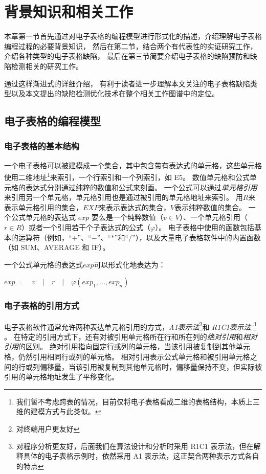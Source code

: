 \chapter{背景知识和相关工作}
本章第一节首先通过对电子表格的编程模型进行形式化的描述，介绍理解电子表格编程过程的必要背景知识，
然后在第二节，结合两个有代表性的实证研究工作，介绍各种类型的电子表格缺陷，
最后在第三节简要介绍电子表格的缺陷预防和缺陷检测相关的研究工作。

通过这样渐进式的详细介绍，
有利于读者进一步理解本文关注的电子表格缺陷类型以及本文提出的缺陷检测优化技术在整个相关工作图谱中的定位。


\section{电子表格的编程模型}

\subsection{电子表格的基本结构}
一个电子表格可以被建模成一个集合，其中包含带有表达式的单元格，这些单元格使用二维地址\footnote{我们暂不考虑跨表的情况，目前仅将电子表格看成二维的表格结构，本质上三维的建模方式与此类似。}来索引，一个行索引和一个列索引，如 E5。
数值单元格和公式单元格的表达式分别通过纯粹的数值和公式来刻画。
一个公式可以通过\textit{单元格引用}来引用另一个单元格，单元格引用也是通过被引用的单元格地址来索引。
用$R$来表示单元格引用的集合，$EXP$来表示表达式的集合，$V$表示纯粹数值的集合。
一个公式单元格的表达式 $exp$ 要么是一个纯粹数值（$v \in V$）、一个单元格引用（$r \in R$）或者一个引用若干个子表达式的公式（$\varphi $）。
电子表格中使用的函数包括基本的运算符（例如，“$+$”、“$-$”、“$*$”和“$/$”），以及大量电子表格软件中的内置函数（如 SUM、AVERAGE 和 IF）。

一个公式单元格的表达式$exp$可以形式化地表达为：
\begin{definition}
    $ exp =\quad v\quad |\quad r\quad |\quad \varphi (exp_1,\dots,exp_n) $
\end{definition}

\subsection{电子表格的引用方式}
电子表格软件通常允许两种表达单元格引用的方式，\textit{A1表示法}\footnote{对终端用户更友好}和 \textit{R1C1表示法} \footnote{对程序分析更友好，后面我们在算法设计和分析时采用 R1C1 表示法，但在解释具体的电子表格示例时，依然采用 A1 表示法，这正契合两种表示方式各自的特点} \cite{tan2014bug}。
在特定的引用方式下，还有对被引用单元格所在行和所在列的\textit{绝对引用}和\textit{相对引用}的区别。
绝对引用指向固定行或列的单元格，当该引用被复制到其他单元格，仍然引用相同行或列的单元格。
相对引用表示公式单元格和被引用单元格之间的行或列偏移量，当该引用被复制到其他单元格时，偏移量保持不变，但实际被引用的单元格地址发生了平移变化。

